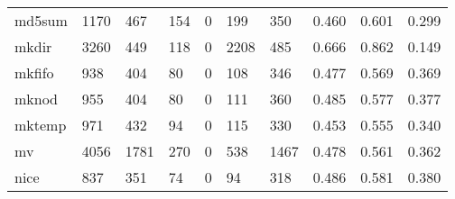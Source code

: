 \begin{longtable}{lp{1.3cm}p{1.3cm}p{1.3cm}p{1.3cm}p{1.3cm}p{1.3cm}p{1.3cm}p{1.3cm}p{1.3cm}}
md5sum    &                   1170 &                                467 &                               154 &                                0 &                               199 &                             350 &                                   0.460 &                                  0.601 &                                0.299 \\
mkdir     &                   3260 &                                449 &                               118 &                                0 &                              2208 &                             485 &                                   0.666 &                                  0.862 &                                0.149 \\
mkfifo    &                    938 &                                404 &                                80 &                                0 &                               108 &                             346 &                                   0.477 &                                  0.569 &                                0.369 \\
mknod     &                    955 &                                404 &                                80 &                                0 &                               111 &                             360 &                                   0.485 &                                  0.577 &                                0.377 \\
mktemp    &                    971 &                                432 &                                94 &                                0 &                               115 &                             330 &                                   0.453 &                                  0.555 &                                0.340 \\
mv        &                   4056 &                               1781 &                               270 &                                0 &                               538 &                            1467 &                                   0.478 &                                  0.561 &                                0.362 \\
nice      &                    837 &                                351 &                                74 &                                0 &                                94 &                             318 &                                   0.486 &                                  0.581 &                                0.380 \\

\end{longtable}
